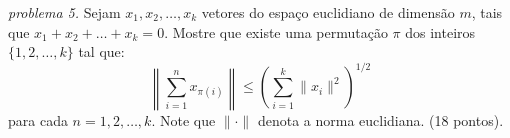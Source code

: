 \textit{problema 5.}
Sejam \(x_1, x_2,\ldots, x_k\) vetores do espaço euclidiano de dimensão \(m\), tais que \(x_1+x_2+\ldots + x_k=0\). Mostre que existe uma permutação \(\pi\) dos inteiros \(\{ 1, 2, \ldots, k \}\) tal que:
\[\left\lVert \sum_{i=1}^n x_{\pi (i)}\right\rVert \leq \left( \sum_{i=1}^k \lVert x_i \rVert ^2\right)^{1/2}\]para cada \(n=1, 2, \ldots, k\). Note que \(\lVert \cdot \rVert\) denota a norma euclidiana.
(18 pontos).
